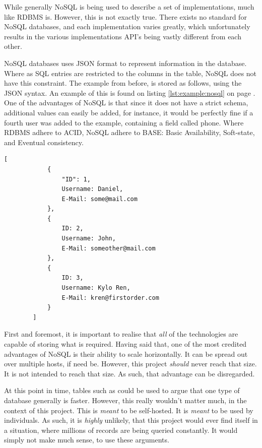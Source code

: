 		While generally NoSQL is being used to describe a set of implementations, much like RDBMS is. However, this is not exactly true. There exists no standard for NoSQL databases, and each implementation varies greatly, which unfortunately results in the various implementations API's being vastly different from each other.

		NoSQL databases uses JSON format to represent information in the database. Where as SQL entries are restricted to the columns in the table, NoSQL does not have this constraint. The example from before, is stored as follows, using the JSON syntax. An example of this is found on listing \ref{lst:example:nosql} on page \pageref{lst:example:nosql}. One of the advantages of NoSQL is that since it does not have a strict schema, additional values can easily be added, for instance, it would be perfectly fine if a fourth user was added to the example, containing a field called phone. Where RDBMS adhere to ACID, NoSQL adhere to BASE: Basic Availability, Soft-state, and Eventual consistency.

		\begin{lstlisting}[style=json2,gobble=8, caption={NoSQL table example},label={lst:example:nosql}]
        [
            {
                "ID": 1,
                Username: Daniel,
                E-Mail: some@mail.com
            },
            {
                ID: 2,
                Username: John,
                E-Mail: someother@mail.com
            },
            {
                ID: 3,
                Username: Kylo Ren,
                E-Mail: kren@firstorder.com
            }
        ]
		\end{lstlisting}

		First and foremost, it is important to realise that \emph{all} of the technologies are capable of storing what is required. Having said that, one of the most credited advantages of NoSQL is their ability to scale horizontally. It can be spread out over multiple hosts, if need be. However, this project \emph{should} never reach that size. It is not intended to reach that size. As such, that advantage can be disregarded.

		At this point in time, tables such as \cite{db_rankings} could be used to argue that one type of database generally is faster. However, this really wouldn't matter much, in the context of this project. This is \emph{meant} to be self-hosted. It is \emph{meant} to be used by individuals. As such, it is \emph{highly} unlikely, that this project would ever find itself in a situation, where millions of records are being queried constantly. It would simply not make much sense, to use these arguments.

